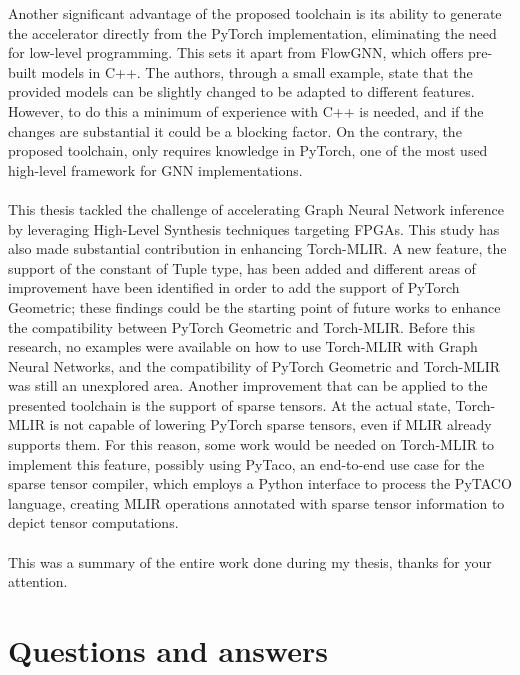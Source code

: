 \documentclass{article}
\begin{document}
Another significant advantage of the proposed toolchain is its ability to generate the accelerator directly from the PyTorch implementation, eliminating the need for low-level programming. This sets it apart from FlowGNN, which offers pre-built models in C++. The authors, through a small example, state that the provided models can be slightly changed to be adapted to different features. However, to do this a minimum of experience with C++ is needed, and if the changes are substantial it could be a blocking factor. On the contrary, the proposed toolchain, only requires knowledge in PyTorch, one of the most used high-level framework for GNN implementations. 
\\
\\
\noindent
This thesis tackled the challenge of accelerating Graph Neural Network inference by leveraging High-Level Synthesis techniques targeting FPGAs. 
This study has also made substantial contribution in enhancing Torch-MLIR. A new feature, the support of the constant of Tuple type, has been added and different areas of improvement have been identified in order to add the support of PyTorch Geometric; these findings could be the starting point of future works to enhance the compatibility between PyTorch Geometric and Torch-MLIR.
Before this research, no examples were available on how to use Torch-MLIR with Graph Neural Networks, and the compatibility of PyTorch Geometric and Torch-MLIR was still an unexplored area. 
Another improvement that can be applied to the presented toolchain is the support of sparse tensors.
At the actual state, Torch-MLIR is not capable of lowering PyTorch sparse tensors, even if MLIR already supports them. For this reason, some work would be needed on Torch-MLIR to implement this feature, possibly using PyTaco, an end-to-end use case for the sparse tensor compiler, which employs a Python interface to process the PyTACO language, creating MLIR operations annotated with sparse tensor information to depict tensor computations.
\\
\\
\noindent
This was a summary of the entire work done during my thesis, thanks for your attention.

\section{Questions and answers}
\end{document}
